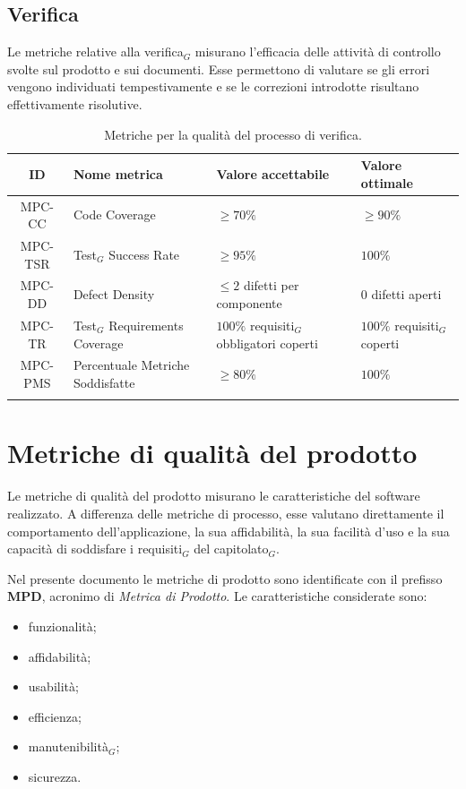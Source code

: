 \documentclass[a4paper, 10pt, colorlinks=true, linkcolor=black, urlcolor=blue, citecolor=blue, hidelinks]{article}
\begin{document}
\subsection{Verifica}

Le metriche relative alla verifica$_G$ misurano l'efficacia delle attività di controllo svolte sul prodotto e sui documenti. Esse permettono di valutare se gli errori vengono individuati tempestivamente e se le correzioni introdotte risultano effettivamente risolutive.

\begingroup
\small
\renewcommand{\arraystretch}{1.25}
\begin{longtable}{|c|p{4cm}|p{3cm}|p{3cm}|}
    \hline
    \textbf{ID} & \textbf{Nome metrica} & \textbf{Valore accettabile} & \textbf{Valore ottimale} \\
    \hline
    \endhead

    MPC-CC & Code Coverage & $\geq 70\%$ & $\geq 90\%$ \\ \hline
    MPC-TSR & Test$_G$ Success Rate & $\geq 95\%$ & $100\%$ \\ \hline
    MPC-DD & Defect Density & $\leq 2$ difetti per componente & $0$ difetti aperti \\ \hline
    MPC-TR & Test$_G$ Requirements Coverage & $100\%$ requisiti$_G$ obbligatori coperti & $100\%$ requisiti$_G$ coperti \\ \hline
    MPC-PMS & Percentuale Metriche Soddisfatte & $\geq 80\%$ & $100\%$ \\ \hline

    \caption{Metriche per la qualità del processo di verifica.}
    \label{tab:metriche-verifica}
\end{longtable}
\endgroup

\section{Metriche di qualità del prodotto}

Le metriche di qualità del prodotto misurano le caratteristiche del software realizzato. A differenza delle metriche di processo, esse valutano direttamente il comportamento dell'applicazione, la sua affidabilità, la sua facilità d'uso e la sua capacità di soddisfare i requisiti$_G$ del capitolato$_G$.

Nel presente documento le metriche di prodotto sono identificate con il prefisso \textbf{MPD}, acronimo di \textit{Metrica di Prodotto}. Le caratteristiche considerate sono:
\begin{itemize}
    \item funzionalità;
    \item affidabilità;
    \item usabilità;
    \item efficienza;
    \item manutenibilità$_G$;
    \item sicurezza.
\end{itemize}
\end{document}
